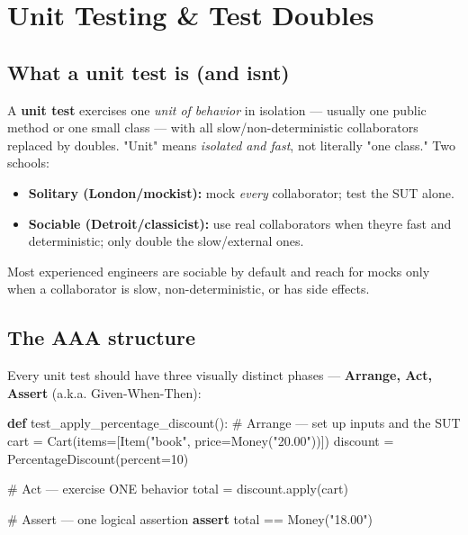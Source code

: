 \documentclass[11pt]{article}
\providecommand{\tightlist}{\setlength{\itemsep}{1pt}\setlength{\parskip}{0pt}}
\newenvironment{Shaded}{\begin{snugshade}}{\end{snugshade}}
\newcommand{\BuiltInTok}[1]{\textcolor[rgb]{0.50,0.55,0.55}{#1}}
\newcommand{\CommentTok}[1]{\textcolor[rgb]{0.48,0.49,0.49}{#1}}
\newcommand{\ControlFlowTok}[1]{\textcolor[rgb]{0.99,0.74,0.29}{\textbf{#1}}}
\newcommand{\DecValTok}[1]{\textcolor[rgb]{0.96,0.45,0.00}{#1}}
\newcommand{\KeywordTok}[1]{\textcolor[rgb]{0.81,0.81,0.76}{\textbf{#1}}}
\newcommand{\NormalTok}[1]{\textcolor[rgb]{0.81,0.81,0.76}{#1}}
\newcommand{\OperatorTok}[1]{\textcolor[rgb]{0.81,0.81,0.76}{#1}}
\newcommand{\StringTok}[1]{\textcolor[rgb]{0.96,0.31,0.31}{#1}}
\begin{document}
\section{Unit Testing \& Test Doubles}\label{unit-testing--test-doubles}

\subsection{What a unit test is (and isn\textquotesingle t)}\label{what-a-unit-test-is-and-isnt}

A \textbf{unit test} exercises one \emph{unit of behavior} in isolation --- usually one public method or one small class --- with all slow/non-deterministic collaborators replaced by doubles. "Unit" means \emph{isolated and fast}, not literally "one class." Two schools:

\begin{itemize}
\tightlist
\item
  \textbf{Solitary (London/mockist):} mock \emph{every} collaborator; test the SUT alone.
\item
  \textbf{Sociable (Detroit/classicist):} use real collaborators when they\textquotesingle re fast and deterministic; only double the slow/external ones.
\end{itemize}

Most experienced engineers are sociable by default and reach for mocks only when a collaborator is slow, non-deterministic, or has side effects.

\subsection{The AAA structure}\label{the-aaa-structure}

Every unit test should have three visually distinct phases --- \textbf{Arrange, Act, Assert} (a.k.a. Given-When-Then):


\begin{Shaded}
\begin{Highlighting}[]
\KeywordTok{def}\NormalTok{ test\_apply\_percentage\_discount():}
    \CommentTok{\# Arrange — set up inputs and the SUT}
\NormalTok{    cart }\OperatorTok{=}\NormalTok{ Cart(items}\OperatorTok{=}\NormalTok{[Item(}\StringTok{"book"}\NormalTok{, price}\OperatorTok{=}\NormalTok{Money(}\StringTok{"20.00"}\NormalTok{))])}
\NormalTok{    discount }\OperatorTok{=}\NormalTok{ PercentageDiscount(percent}\OperatorTok{=}\DecValTok{10}\NormalTok{)}

    \CommentTok{\# Act — exercise ONE behavior}
\NormalTok{    total }\OperatorTok{=}\NormalTok{ discount.}\BuiltInTok{apply}\NormalTok{(cart)}

    \CommentTok{\# Assert — one logical assertion}
    \ControlFlowTok{assert}\NormalTok{ total }\OperatorTok{==}\NormalTok{ Money(}\StringTok{"18.00"}\NormalTok{)}
\end{Highlighting}
\end{Shaded}
\end{document}
